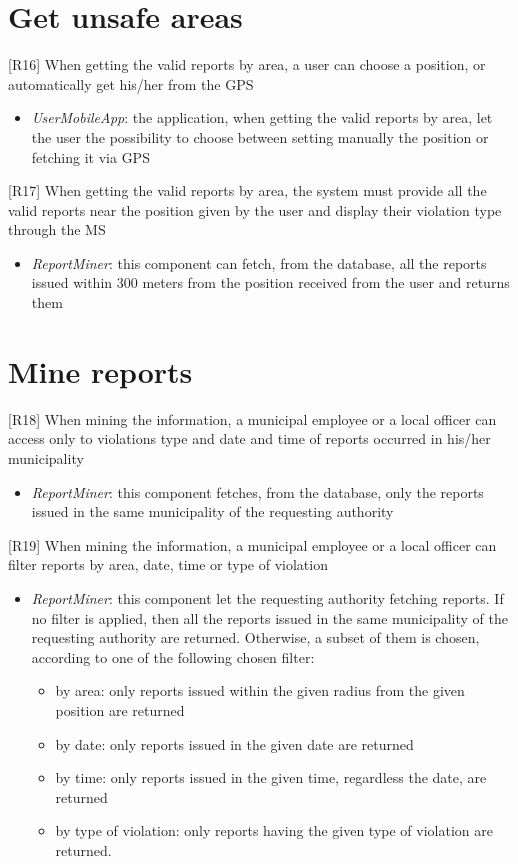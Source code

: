 		\section{Get unsafe areas}
			{[R16]} When getting the valid reports by area, a user can choose a position, or automatically get his/her from the GPS
					\begin{itemize}
						\item \textit{UserMobileApp}: the application, when getting the valid reports by area, let the user the possibility to choose between setting manually the position or fetching it via GPS
					\end{itemize}
			{[R17]} When getting the valid reports by area, the system must provide all the valid reports near the position given by the user and display their violation type through the MS
					\begin{itemize}
						\item \textit{ReportMiner}: this component can fetch, from the database, all the reports issued within 300 meters from the position received from the user and returns them
					\end{itemize}
		\section{Mine reports}
			{[R18]} When mining the information, a municipal employee or a local officer can access only to violations type and date and time of reports occurred in his/her municipality
				\begin{itemize}
						\item \textit{ReportMiner}: this component fetches, from the database, only the reports issued in the same municipality of the requesting authority
					\end{itemize}
			{[R19]} When mining the information, a municipal employee or a local officer can filter reports by area, date, time or type of violation
					\begin{itemize}
						\item \textit{ReportMiner}: this component let the requesting authority fetching reports. If no filter is applied, then all the reports issued in the same municipality of the requesting authority are returned. Otherwise, a subset of them is chosen, according to one of the following chosen filter:
							\begin{itemize}
								\item by area: only reports issued within the given radius from the given position are returned
								\item by date: only reports issued in the given date are returned
								\item by time: only reports issued in the given time, regardless the date, are returned
								\item by type of violation: only reports having the given type of violation are returned.
							\end{itemize}
					\end{itemize}
